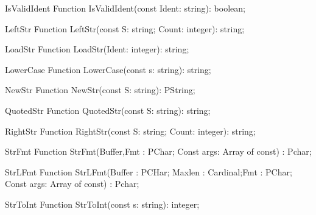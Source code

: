  
\begin{function}{IsValidIdent}
\Declaration
Function IsValidIdent(const Ident: string): boolean;
\Description
\Errors
\SeeAlso
\end{function}

 
\begin{function}{LeftStr}
\Declaration
Function LeftStr(const S: string; Count: integer): string;
\Description
\Errors
\SeeAlso
\end{function}

 
\begin{function}{LoadStr}
\Declaration
Function LoadStr(Ident: integer): string;
\Description
\Errors
\SeeAlso
\end{function}

 
\begin{function}{LowerCase}
\Declaration
Function LowerCase(const s: string): string;
\Description
\Errors
\SeeAlso
\end{function}

 
\begin{function}{NewStr}
\Declaration
Function NewStr(const S: string): PString;
\Description
\Errors
\SeeAlso
\end{function}

 
\begin{function}{QuotedStr}
\Declaration
Function QuotedStr(const S: string): string;
\Description
\Errors
\SeeAlso
\end{function}

 
\begin{function}{RightStr}
\Declaration
Function RightStr(const S: string; Count: integer): string;
\Description
\Errors
\SeeAlso
\end{function}

 
\begin{function}{StrFmt}
\Declaration
Function StrFmt(Buffer,Fmt : PChar; Const args: Array of const) : Pchar;
\Description
\Errors
\SeeAlso
\end{function}

 
\begin{function}{StrLFmt}
\Declaration
Function StrLFmt(Buffer : PCHar; Maxlen : Cardinal;Fmt : PChar; Const args: Array of const) : Pchar;
\Description
\Errors
\SeeAlso
\end{function}

 
\begin{function}{StrToInt}
\Declaration
Function StrToInt(const s: string): integer;
\Description
\Errors
\SeeAlso
\end{function}

